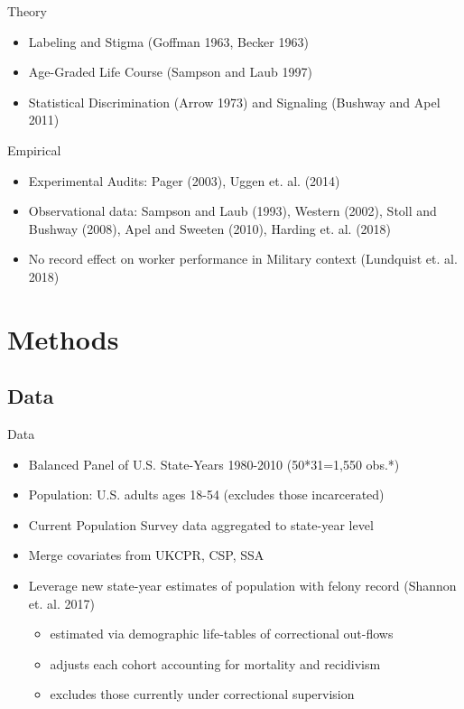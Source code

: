 \documentclass{beamer}
\begin{document}
\begin{frame}

\begin{block}{Theory}
\begin{itemize}
\item Labeling and Stigma (Goffman 1963, Becker 1963)
\item Age-Graded Life Course (Sampson and Laub 1997)
\item Statistical Discrimination (Arrow 1973) and Signaling (Bushway and Apel 2011)
\end{itemize}
\end{block}

\begin{block}{Empirical}
\begin{itemize}
\item Experimental Audits: Pager (2003), Uggen et. al. (2014)
\item Observational data: Sampson and Laub (1993), Western (2002), Stoll and Bushway (2008), Apel and Sweeten (2010), Harding et. al. (2018)
\item No record effect on worker performance in Military context (Lundquist et. al. 2018)
\end{itemize}
\end{block}

\end{frame}

\section{Methods}
\subsection{Data}

\begin{frame}{Data}
\begin{block}{}
\begin{itemize}

\item Balanced Panel of U.S. State-Years 1980-2010 (50*31=1,550 obs.*)
\item Population: U.S. adults ages 18-54 (excludes those incarcerated)
\item Current Population Survey data aggregated to state-year level
\item Merge covariates from UKCPR, CSP, SSA
\item Leverage new state-year estimates of population with felony record (Shannon et. al. 2017)
  \begin{itemize}
  \item estimated via demographic life-tables of correctional out-flows 
  \item adjusts each cohort accounting for mortality and recidivism
  \item excludes those currently under correctional supervision
  \end{itemize}
\end{itemize}
\end{block}
\end{frame}
\end{document}
